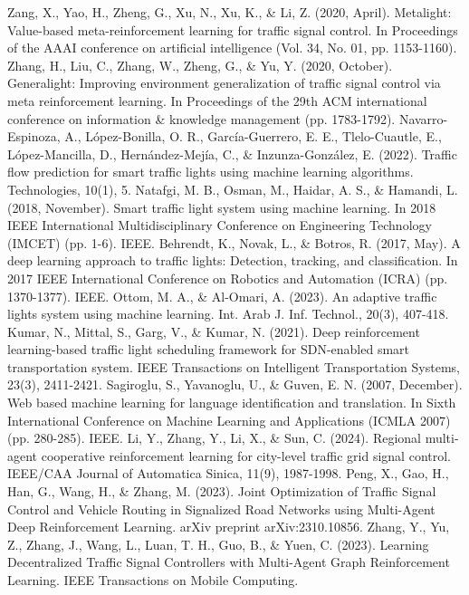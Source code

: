 \documentclass[conference]{IEEEtran}
\begin{document}
\begin{thebibliography}{00}
 Zang, X., Yao, H., Zheng, G., Xu, N., Xu, K., \& Li, Z. (2020, April). Metalight: Value-based meta-reinforcement learning for traffic signal control. In Proceedings of the AAAI conference on artificial intelligence (Vol. 34, No. 01, pp. 1153-1160).
 Zhang, H., Liu, C., Zhang, W., Zheng, G., \& Yu, Y. (2020, October). Generalight: Improving environment generalization of traffic signal control via meta reinforcement learning. In Proceedings of the 29th ACM international conference on information \& knowledge management (pp. 1783-1792).
 Navarro-Espinoza, A., López-Bonilla, O. R., García-Guerrero, E. E., Tlelo-Cuautle, E., López-Mancilla, D., Hernández-Mejía, C., \& Inzunza-González, E. (2022). Traffic flow prediction for smart traffic lights using machine learning algorithms. Technologies, 10(1), 5.
 Natafgi, M. B., Osman, M., Haidar, A. S., \& Hamandi, L. (2018, November). Smart traffic light system using machine learning. In 2018 IEEE International Multidisciplinary Conference on Engineering Technology (IMCET) (pp. 1-6). IEEE.
 Behrendt, K., Novak, L., \& Botros, R. (2017, May). A deep learning approach to traffic lights: Detection, tracking, and classification. In 2017 IEEE International Conference on Robotics and Automation (ICRA) (pp. 1370-1377). IEEE.
 Ottom, M. A., \& Al-Omari, A. (2023). An adaptive traffic lights system using machine learning. Int. Arab J. Inf. Technol., 20(3), 407-418.
 Kumar, N., Mittal, S., Garg, V., \& Kumar, N. (2021). Deep reinforcement learning-based traffic light scheduling framework for SDN-enabled smart transportation system. IEEE Transactions on Intelligent Transportation Systems, 23(3), 2411-2421.
 Sagiroglu, S., Yavanoglu, U., \& Guven, E. N. (2007, December). Web based machine learning for language identification and translation. In Sixth International Conference on Machine Learning and Applications (ICMLA 2007) (pp. 280-285). IEEE.
 Li, Y., Zhang, Y., Li, X., \& Sun, C. (2024). Regional multi-agent cooperative reinforcement learning for city-level traffic grid signal control. IEEE/CAA Journal of Automatica Sinica, 11(9), 1987-1998.
 Peng, X., Gao, H., Han, G., Wang, H., \& Zhang, M. (2023). Joint Optimization of Traffic Signal Control and Vehicle Routing in Signalized Road Networks using Multi-Agent Deep Reinforcement Learning. arXiv preprint arXiv:2310.10856.
 Zhang, Y., Yu, Z., Zhang, J., Wang, L., Luan, T. H., Guo, B., \& Yuen, C. (2023). Learning Decentralized Traffic Signal Controllers with Multi-Agent Graph Reinforcement Learning. IEEE Transactions on Mobile Computing.

\end{thebibliography}
\end{document}

